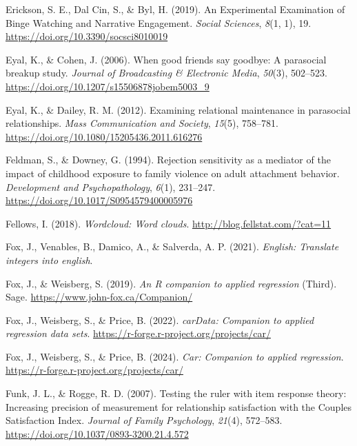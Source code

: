\documentclass[
]{udthesis}
\newlength{\cslhangindent}
\newenvironment{CSLReferences}[2] %
 {\begin{list}{}{%
  \setlength{\itemindent}{0pt}
  \setlength{\leftmargin}{0pt}
  \setlength{\parsep}{0pt}
  \ifodd #1
   \setlength{\leftmargin}{\cslhangindent}
   \setlength{\itemindent}{-1\cslhangindent}
  \fi
  \setlength{\itemsep}{#2\baselineskip}}}
 {\end{list}}
\begin{document}
\begin{CSLReferences}{1}{0}
Erickson, S. E., Dal Cin, S., \& Byl, H. (2019). An {Experimental Examination} of {Binge Watching} and {Narrative Engagement}. \emph{Social Sciences}, \emph{8}(1, 1), 19. \url{https://doi.org/10.3390/socsci8010019}

Eyal, K., \& Cohen, J. (2006). When good friends say goodbye: A parasocial breakup study. \emph{Journal of Broadcasting \& Electronic Media}, \emph{50}(3), 502--523. \url{https://doi.org/10.1207/s15506878jobem5003_9}

Eyal, K., \& Dailey, R. M. (2012). Examining relational maintenance in parasocial relationships. \emph{Mass Communication and Society}, \emph{15}(5), 758--781. \url{https://doi.org/10.1080/15205436.2011.616276}

Feldman, S., \& Downey, G. (1994). Rejection sensitivity as a mediator of the impact of childhood exposure to family violence on adult attachment behavior. \emph{Development and Psychopathology}, \emph{6}(1), 231--247. \url{https://doi.org/10.1017/S0954579400005976}

Fellows, I. (2018). \emph{Wordcloud: Word clouds}. \url{http://blog.fellstat.com/?cat=11}

Fox, J., Venables, B., Damico, A., \& Salverda, A. P. (2021). \emph{English: Translate integers into english}.

Fox, J., \& Weisberg, S. (2019). \emph{An {R} companion to applied regression} (Third). Sage. \url{https://www.john-fox.ca/Companion/}

Fox, J., Weisberg, S., \& Price, B. (2022). \emph{carData: Companion to applied regression data sets}. \url{https://r-forge.r-project.org/projects/car/}

Fox, J., Weisberg, S., \& Price, B. (2024). \emph{Car: Companion to applied regression}. \url{https://r-forge.r-project.org/projects/car/}

Funk, J. L., \& Rogge, R. D. (2007). Testing the ruler with item response theory: {Increasing} precision of measurement for relationship satisfaction with the {Couples Satisfaction Index}. \emph{Journal of Family Psychology}, \emph{21}(4), 572--583. \url{https://doi.org/10.1037/0893-3200.21.4.572}


\end{CSLReferences}
\end{document}
